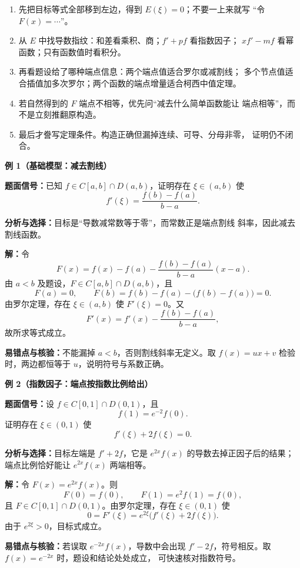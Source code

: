 \begin{knowledgeBox}
\begin{enumerate}
  \item 先把目标等式全部移到左边，得到 \(E(\xi)=0\)；不要一上来就写
  “令 \(F(x)=\cdots\)”。
  \item 从 \(E\) 中找导数指纹：和差看乘积、商；\(f'+pf\) 看指数因子；
  \(xf'-mf\) 看幂函数；只有函数值时看积分。
  \item 再看题设给了哪种端点信息：两个端点值适合罗尔或减割线；
  多个节点值适合插值加多次罗尔；两个函数的端点增量适合柯西中值定理。
  \item 若自然得到的 \(F\) 端点不相等，优先问“减去什么简单函数能让
  端点相等”，而不是立刻推翻原构造。
  \item 最后才誊写定理条件。构造正确但漏掉连续、可导、分母非零，
  证明仍不闭合。
\end{enumerate}

\textbf{例 1（基础模型：减去割线）}

\textbf{题面信号：}已知 \(f\in C[a,b]\cap D(a,b)\)，证明存在
\(\xi\in(a,b)\) 使
\[
f'(\xi)=\frac{f(b)-f(a)}{b-a}.
\]

\textbf{分析与选择：}目标是“导数减常数等于零”，而常数正是端点割线
斜率，因此减去割线函数。

\textbf{解：}令
\[
F(x)=f(x)-f(a)-\frac{f(b)-f(a)}{b-a}(x-a).
\]
由 \(a<b\) 及题设，\(F\in C[a,b]\cap D(a,b)\)，且
\[
F(a)=0,\qquad F(b)=f(b)-f(a)-\bigl(f(b)-f(a)\bigr)=0.
\]
由罗尔定理，存在 \(\xi\in(a,b)\) 使 \(F'(\xi)=0\)。又
\[
F'(x)=f'(x)-\frac{f(b)-f(a)}{b-a},
\]
故所求等式成立。

\textbf{易错点与核验：}不能漏掉 \(a<b\)，否则割线斜率无定义。取
\(f(x)=ux+v\) 检验时，两边都恒等于 \(u\)，说明符号与系数正确。

\textbf{例 2（指数因子：端点按指数比例给出）}

\textbf{题面信号：}设 \(f\in C[0,1]\cap D(0,1)\)，且
\[
f(1)=e^{-2}f(0).
\]
证明存在 \(\xi\in(0,1)\) 使
\[
f'(\xi)+2f(\xi)=0.
\]

\textbf{分析与选择：}目标左端是 \(f'+2f\)，它是
\(e^{2x}f(x)\) 的导数去掉正因子后的结果；端点比例恰好能让
\(e^{2x}f(x)\) 两端相等。

\textbf{解：}令 \(F(x)=e^{2x}f(x)\)。则
\[
F(0)=f(0),\qquad F(1)=e^2f(1)=f(0),
\]
且 \(F\in C[0,1]\cap D(0,1)\)。由罗尔定理，存在
\(\xi\in(0,1)\) 使
\[
0=F'(\xi)=e^{2\xi}\bigl(f'(\xi)+2f(\xi)\bigr).
\]
由于 \(e^{2\xi}>0\)，目标式成立。

\textbf{易错点与核验：}若误取 \(e^{-2x}f(x)\)，导数中会出现
\(f'-2f\)，符号相反。取 \(f(x)=e^{-2x}\) 时，题设和结论处处成立，
可快速核对指数符号。


\end{knowledgeBox}
